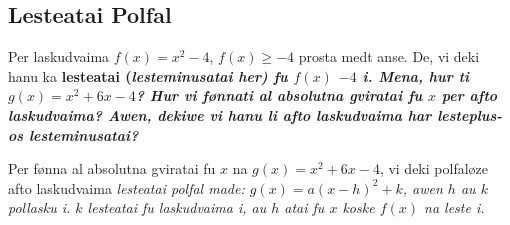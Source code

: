 \subsection{Lesteatai Polfal}
Per laskudvaima \(f\left(x\right) = x^2-4\), \(f\left(x\right)\geq-4\) prosta medt anse. De, vi deki hanu
ka \bf{lesteatai} (\it{lesteminusatai} her) fu \(f\left(x\right)\) \(-4\) i. Mena, hur ti
\(g\left(x\right) = x^2+6x-4\)? Hur vi fønnati al absolutna gviratai fu \(x\) per afto laskudvaima?
Awen, dekiwe vi hanu li afto laskudvaima har lesteplus- os lesteminusatai?

Per fønna al absolutna gviratai fu \(x\) na \(g\left(x\right)=x^2+6x-4\), vi deki polfaløze afto
laskudvaima \it{lesteatai polfal} made: \(g\left(x\right) = a{\left(x-h\right)}^2+k\), awen
\(h\) au \(k\) pollasku i. \(k\) lesteatai fu laskudvaima i, au \(h\) atai fu \(x\) koske \(f\left(x\right)\)
na leste i.


